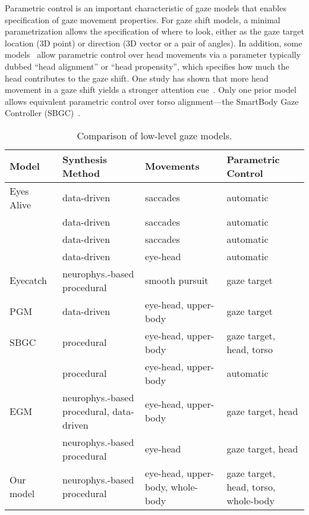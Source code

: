 Parametric control is an important characteristic of gaze models that enables specification of gaze movement properties. For gaze shift models, a minimal parametrization allows the specification of where to look, either as the gaze target location (3D point) or direction (3D vector or a pair of angles). In addition, some models~\citep{peters2010animating,lance2010expressive,thiebaux2009realtime} allow parametric control over head movements via a parameter typically dubbed ``head alignment'' or ``head propensity'', which specifies how much the head contributes to the gaze shift. One study has shown that more head movement in a gaze shift yields a stronger attention cue~\citep{andrist2012designing}. Only one prior model allows equivalent parametric control over torso alignment---the SmartBody Gaze Controller (SBGC)~\citep{thiebaux2009realtime}.

\begin{table}
\small
\centering
\def\arraystretch{1.5}
\begin{tabularx}{\textwidth}{P{3cm}P{3.5cm}P{3.5cm}P{3.5cm}}
\hline
\textbf{Model} & \textbf{Synthesis Method} & \textbf{Movements} & \textbf{Parametric Control} \\
\hline
Eyes Alive~\citep{lee2002eyes} & data-driven & saccades & automatic \\
\citet{deng2005automated} & data-driven & saccades & automatic \\
\citet{ma2009natural} & data-driven & saccades & automatic \\
\citet{le2012live} & data-driven & eye-head & automatic \\
Eyecatch~\citep{yeo2012eyecatch} & neurophys.-based procedural & smooth pursuit & gaze target \\
PGM~\citep{heck2007automated} & data-driven & eye-head, upper-body & gaze target \\
SBGC~\citep{thiebaux2009realtime} & procedural & eye-head, upper-body & gaze target, head, torso \\
\citet{grillon2009crowds} & procedural & eye-head, upper-body & automatic \\
EGM~\citep{lance2010expressive} & neurophys.-based procedural, data-driven & eye-head, upper-body & gaze target, head \\
\citet{peters2010animating} & neurophys.-based procedural & eye-head & gaze target, head \\
\hdashline
Our model & neurophys.-based procedural & eye-head, upper-body, whole-body & gaze target, head, torso, whole-body \\
\hline
\end{tabularx}
\caption{Comparison of low-level gaze models.}
\label{tab:LowLevelGazeModels}
\end{table}

